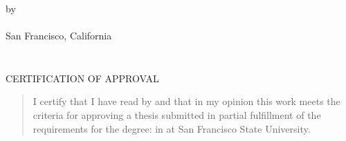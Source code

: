 \documentclass[12pt,oneside]{sfsuthesis}
\theoremstyle{plain} %
\theoremstyle{definition}  %
\theoremstyle{remark}  %
\begin{document}
\thispagestyle{empty}

\[ \]
\vspace{-1.9in}

\begin{center}
{\mytitle}

\vspace{1.4in}


\vspace{.5in}


\vspace{3.1in}

{by \\[12pt] 
\myname \\[12pt]
San Francisco, California\\[12pt]
\thismonth
\thisyear}
\end{center}

\newpage
\textheight=7.1in    %
\footskip=1.1in      %
\thispagestyle{empty}

$\mbox{}$
\vspace{3in}
\begin{center}
\end{center}

\newpage
\thispagestyle{empty}
\[ \]
\vspace{-1.8in}
\begin{center}
{CERTIFICATION OF APPROVAL}
\end{center}
\vspace{.6in}
\begin{quote}
I certify that I have read {\it \mytitle} by \myname and that in my opinion this work meets the criteria for approving a thesis submitted in partial fulfillment of the requirements
for the degree: \mydegree in \myfield at San Francisco State University.
\end{quote}
\end{document}
